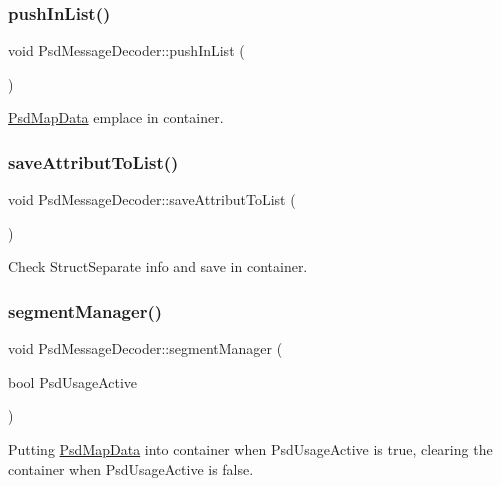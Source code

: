 \subsubsection{\texorpdfstring{push\+In\+List()}{pushInList()}}
{\footnotesize\ttfamily void Psd\+Message\+Decoder\+::push\+In\+List (\begin{DoxyParamCaption}{ }\end{DoxyParamCaption})}



\hyperlink{struct_psd_map_data}{Psd\+Map\+Data} emplace in container. 

\mbox{\label{class_psd_message_decoder_ab65ca19c37ae0fcf45af498081c80e18}} 
\subsubsection{\texorpdfstring{save\+Attribut\+To\+List()}{saveAttributToList()}}
{\footnotesize\ttfamily void Psd\+Message\+Decoder\+::save\+Attribut\+To\+List (\begin{DoxyParamCaption}{ }\end{DoxyParamCaption})}



Check Struct\+Separate info and save in container. 

\mbox{\label{class_psd_message_decoder_adea08ce30ab67d1a71ab7ea4463ed4a2}} 
\subsubsection{\texorpdfstring{segment\+Manager()}{segmentManager()}}
{\footnotesize\ttfamily void Psd\+Message\+Decoder\+::segment\+Manager (\begin{DoxyParamCaption}\item[{bool}]{Psd\+Usage\+Active }\end{DoxyParamCaption})}



Putting \hyperlink{struct_psd_map_data}{Psd\+Map\+Data} into container when Psd\+Usage\+Active is true, clearing the container when Psd\+Usage\+Active is false. 

